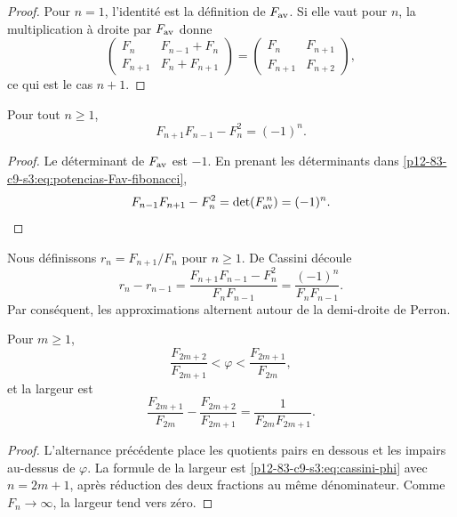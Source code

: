 \begin{proof}
Pour \(n=1\), l’identité est la définition de \(F_{\rm av}\). Si elle vaut
pour \(n\), la multiplication à droite par \(F_{\rm av}\) donne
\[
 \begin{pmatrix}
 F_n&F_{n-1}+F_n\\
 F_{n+1}&F_n+F_{n+1}
 \end{pmatrix}
 =
 \begin{pmatrix}
 F_n&F_{n+1}\\
 F_{n+1}&F_{n+2}
 \end{pmatrix},
\]
ce qui est le cas \(n+1\).
\end{proof}

\begin{theorem}
\label{p12-83-c9-s3:thm:cassini-phi}
Pour tout \(n\geq1\),
\begin{equation}
 \boxed{F_{n+1}F_{n-1}-F_n^2=(-1)^n.}
 \label{p12-83-c9-s3:eq:cassini-phi}
\end{equation}
\end{theorem}

\begin{proof}
Le déterminant de \(F_{\rm av}\) est \(-1\). En prenant les déterminants dans
\eqref{p12-83-c9-s3:eq:potencias-Fav-fibonacci},
\[
 F_{n-1}F_{n+1}-F_n^2
 =\det(F_{\rm av}^{\,n})=(-1)^n.
\]
\end{proof}

Nous définissons \(r_n=F_{n+1}/F_n\) pour \(n\geq1\). De Cassini découle
\[
 r_n-r_{n-1}
 =\frac{F_{n+1}F_{n-1}-F_n^2}{F_nF_{n-1}}
 =\frac{(-1)^n}{F_nF_{n-1}}.
\]
Par conséquent, les approximations alternent autour de la demi-droite de Perron.

\begin{proposition}
\label{p12-83-c9-s3:prop:horquillas-perron-phi}
Pour \(m\geq1\),
\begin{equation}
 \frac{F_{2m+2}}{F_{2m+1}}
 <\varphi<
 \frac{F_{2m+1}}{F_{2m}},
 \label{p12-83-c9-s3:eq:horquilla-fibonacci-phi}
\end{equation}
et la largeur est
\begin{equation}
 \boxed{
 \frac{F_{2m+1}}{F_{2m}}
 -\frac{F_{2m+2}}{F_{2m+1}}
 =\frac{1}{F_{2m}F_{2m+1}}.}
 \label{p12-83-c9-s3:eq:anchura-fibonacci-phi}
\end{equation}
\end{proposition}

\begin{proof}
L’alternance précédente place les quotients pairs en dessous et les impairs
au-dessus de \(\varphi\). La formule de la largeur est
\eqref{p12-83-c9-s3:eq:cassini-phi} avec \(n=2m+1\), après réduction des deux fractions au
même dénominateur. Comme \(F_n\to\infty\), la largeur tend vers zéro.
\end{proof}

